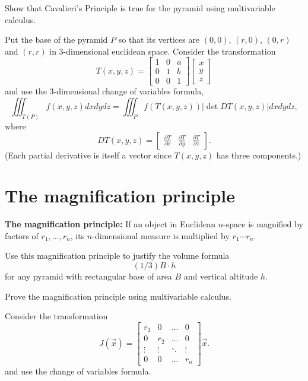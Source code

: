 \documentclass[newpage,hints,handout]{ximera}
\begin{document}
\begin{problem}
Show that Cavalieri's Principle is true for the pyramid using
multivariable calculus.

\begin{hint}
Put the base of the pyramid $P$ so that its vertices are $\left(
0,0\right) $, $\left( r,0\right) $, $\left( 0,r\right) $ and $\left(
r,r\right) $ in $3$-dimensional euclidean space. Consider the
transformation%
\[
T(x,y,z)=
\begin{bmatrix}
1 & 0 & a\\
0 & 1 & b\\
0 & 0 & 1
\end{bmatrix}
\begin{bmatrix} x \\ y \\ z\end{bmatrix}
\]
and use the 3-dimensional change of variables formula,
$$\iiint_{T(P)} f(x,y,z)dxdydz=\iiint_P f(T(x,y,z))\lvert\det DT(x,y,z)\rvert dxdydz,$$
where
$$DT(x,y,z)=\begin{bmatrix}
\frac{\partial T}{\partial x} & \frac{\partial T}{\partial y} & \frac{\partial T}{\partial z}
\end{bmatrix}.$$
(Each partial derivative is itself a vector since $T(x,y,z)$ has three
components.)
\end{hint}



\end{problem}

\section{The magnification principle}

\textbf{The magnification principle:} If an object in Euclidean $n$-space is
magnified by factors of $r_{1},\ldots,r_{n}$, its $n$-dimensional
measure is multiplied by $r_{1}\cdots r_{n}$.

\begin{problem}
Use this magnification principle to justify the volume formula%
\[
(1/3)B\cdot h
\]
for any pyramid with rectangular base of area $B$ and vertical altitude $h$.
\end{problem}

\begin{problem}
Prove the magnification principle using multivariable calculus.

\begin{hint}
Consider the transformation%
\[
J(\vec x)=
\begin{bmatrix}
r_{1} & 0   & \dots & 0\\
0     & r_2 & \dots & 0\\
\vdots &\vdots &\ddots & \vdots \\
0     & 0   & \dots & r_{n}%
\end{bmatrix}\vec x.
\]
and use the change of variables formula.
\end{hint}
\end{problem}
\end{document}
